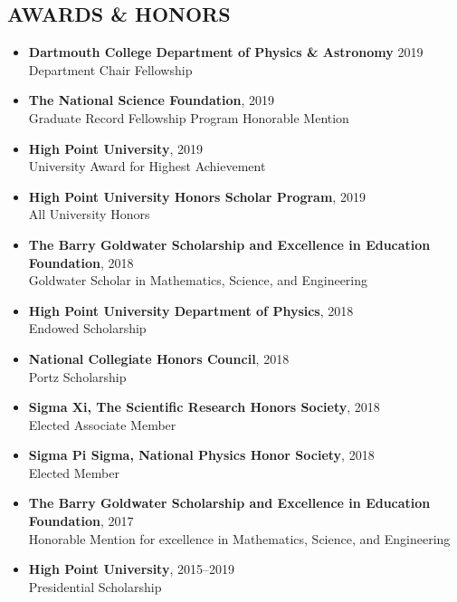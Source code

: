 \documentclass[margin, 10pt]{res} %
\begin{document}
\begin{resume}
\section{AWARDS \& HONORS}
\begin{itemize}
	\item \textbf{{\scriptsize Dartmouth College Department of Physics \& Astronomy}} {\small 2019}\\Department Chair Fellowship
    \item \textbf{{\scriptsize The National Science Foundation}}, {\small 2019}\\Graduate Record Fellowship Program Honorable Mention
    \item \textbf{{\scriptsize High Point University}},
    {\small 2019}\\University Award for Highest Achievement
    \item \textbf{{\scriptsize High Point University Honors Scholar Program}},
    {\small 2019}\\All University Honors
	\item \textbf{{\scriptsize The Barry Goldwater Scholarship and Excellence in Education Foundation}}, {\small 2018}\\Goldwater Scholar in Mathematics, Science, and Engineering 
    \item \textbf{{\scriptsize High Point University Department of Physics}}, {\small 2018}\\Endowed Scholarship
    \item {\scriptsize \textbf{National Collegiate Honors Council}}, {\small 2018}\\Portz Scholarship
    \item \textbf{{\scriptsize Sigma Xi, The Scientific Research Honors Society}}, {\small 2018}\\Elected Associate Member
     \item \textbf{{\scriptsize Sigma Pi Sigma, National Physics Honor Society}}, {\small 2018}\\Elected Member
    \item \textbf{{\scriptsize The Barry Goldwater Scholarship and Excellence in Education Foundation}}, {\small 2017}\\Honorable Mention for excellence in Mathematics, Science, and Engineering 
	\item \textbf{{\scriptsize High Point University}}, {\small 2015--2019}\\Presidential Scholarship
\end{itemize}


\end{resume}
\end{document}
